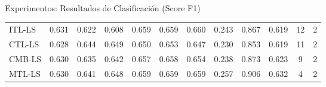 \documentclass[aspectratio=43]{beamer}
\newcommand{\fmax}[1]{{\num[detect-weight=true,math-rm=\mathbf]{#1}}}
\newcommand{\fmod}[1]{\textsf{#1}}
\begin{document}
\begin{frame}{Experimentos: Resultados de Clasificación (Score F1)}
\begin{table}[t]
{\begin{tabular}{ l*{8}{S[table-format=1.3]} c c c}
              \midrule
              \fmod{ITL-LS}    &          \fmax{0.631} &           0.622 &                  0.608 &         \fmax{0.659} &          \fmax{0.659} &                 \fmax{0.660} &    0.243 &   0.867 & 0.619 &     12 & 2 \\
              \fmod{CTL-LS}    &          0.628 &           \fmax{0.644} &                  \fmax{0.649} &         0.650 &          0.653 &                 0.647 &    0.230 &   0.853 & 0.619 &     11 & 2 \\
              \fmod{CMB-LS} &          0.630 &           0.635 &                  0.642 &         0.657 &          0.658 &                 0.654 &    0.238 &   0.873 & 0.623 &      9 & 2 \\
              \fmod{MTL-LS}    &          0.630 &           0.641 &                  0.648 &         \fmax{0.659} &          \fmax{0.659} &                 0.659 &    \fmax{0.257} &   \fmax{0.906} & \fmax{0.632} &      4 & 2 \\
              \bottomrule
            \end{tabular}}
        \end{table}
  
  \end{frame}
  
\end{document}
